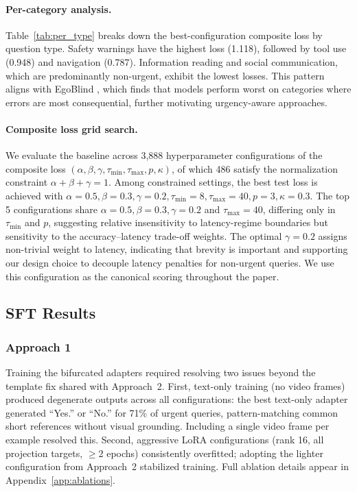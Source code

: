 \documentclass{article}
\begin{document}
\paragraph{Per-category analysis.}
Table~\ref{tab:per_type} breaks down the best-configuration composite loss by question type. Safety warnings have the highest loss (1.118), followed by tool use (0.948) and navigation (0.787). Information reading and social communication, which are predominantly non-urgent, exhibit the lowest losses. This pattern aligns with EgoBlind \cite{xiao2025egoblind}, which finds that models perform worst on categories where errors are most consequential, further motivating urgency-aware approaches.

\paragraph{Composite loss grid search.}
We evaluate the baseline across 3{,}888 hyperparameter configurations of the composite loss $(\alpha, \beta, \gamma, \tau_{\min}, \tau_{\max}, p, \kappa)$, of which 486 satisfy the normalization constraint $\alpha+\beta+\gamma=1$. Among constrained settings, the best test loss is achieved with $\alpha\!=\!0.5, \beta\!=\!0.3, \gamma\!=\!0.2, \tau_{\min}\!=\!8, \tau_{\max}\!=\!40, p\!=\!3, \kappa\!=\!0.3$. The top 5 configurations share $\alpha\!=\!0.5, \beta\!=\!0.3, \gamma\!=\!0.2$ and $\tau_{\max}\!=\!40$, differing only in $\tau_{\min}$ and $p$, suggesting relative insensitivity to latency-regime boundaries but sensitivity to the accuracy--latency trade-off weights. The optimal $\gamma\!=\!0.2$ assigns non-trivial weight to latency, indicating that brevity is important and supporting our design choice to decouple latency penalties for non-urgent queries. We use this configuration as the canonical scoring throughout the paper.

\subsection{SFT Results}\label{sec:sft_results}

\subsubsection{Approach 1}
Training the bifurcated adapters required resolving two issues beyond the template fix shared with Approach~2. First, text-only training (no video frames) produced degenerate outputs across all configurations: the best text-only adapter generated ``Yes.'' or ``No.'' for 71\% of urgent queries, pattern-matching common short references without visual grounding. Including a single video frame per example resolved this. Second, aggressive LoRA configurations (rank 16, all projection targets, $\geq$2 epochs) consistently overfitted; adopting the lighter configuration from Approach~2 stabilized training. Full ablation details appear in Appendix~\ref{app:ablations}.
\end{document}
